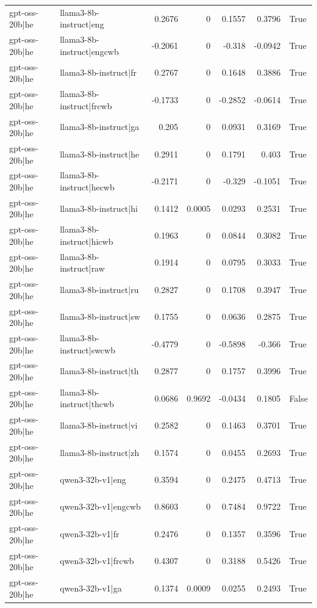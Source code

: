 \begin{table}
\begin{tabular}{l l r r r r l}
gpt-oss-20b|he & llama3-8b-instruct|eng & 0.2676 & 0 & 0.1557 & 0.3796 & True \\
gpt-oss-20b|he & llama3-8b-instruct|engcwb & -0.2061 & 0 & -0.318 & -0.0942 & True \\
gpt-oss-20b|he & llama3-8b-instruct|fr & 0.2767 & 0 & 0.1648 & 0.3886 & True \\
gpt-oss-20b|he & llama3-8b-instruct|frcwb & -0.1733 & 0 & -0.2852 & -0.0614 & True \\
gpt-oss-20b|he & llama3-8b-instruct|ga & 0.205 & 0 & 0.0931 & 0.3169 & True \\
gpt-oss-20b|he & llama3-8b-instruct|he & 0.2911 & 0 & 0.1791 & 0.403 & True \\
gpt-oss-20b|he & llama3-8b-instruct|hecwb & -0.2171 & 0 & -0.329 & -0.1051 & True \\
gpt-oss-20b|he & llama3-8b-instruct|hi & 0.1412 & 0.0005 & 0.0293 & 0.2531 & True \\
gpt-oss-20b|he & llama3-8b-instruct|hicwb & 0.1963 & 0 & 0.0844 & 0.3082 & True \\
gpt-oss-20b|he & llama3-8b-instruct|raw & 0.1914 & 0 & 0.0795 & 0.3033 & True \\
gpt-oss-20b|he & llama3-8b-instruct|ru & 0.2827 & 0 & 0.1708 & 0.3947 & True \\
gpt-oss-20b|he & llama3-8b-instruct|sw & 0.1755 & 0 & 0.0636 & 0.2875 & True \\
gpt-oss-20b|he & llama3-8b-instruct|swcwb & -0.4779 & 0 & -0.5898 & -0.366 & True \\
gpt-oss-20b|he & llama3-8b-instruct|th & 0.2877 & 0 & 0.1757 & 0.3996 & True \\
gpt-oss-20b|he & llama3-8b-instruct|thcwb & 0.0686 & 0.9692 & -0.0434 & 0.1805 & False \\
gpt-oss-20b|he & llama3-8b-instruct|vi & 0.2582 & 0 & 0.1463 & 0.3701 & True \\
gpt-oss-20b|he & llama3-8b-instruct|zh & 0.1574 & 0 & 0.0455 & 0.2693 & True \\
gpt-oss-20b|he & qwen3-32b-v1|eng & 0.3594 & 0 & 0.2475 & 0.4713 & True \\
gpt-oss-20b|he & qwen3-32b-v1|engcwb & 0.8603 & 0 & 0.7484 & 0.9722 & True \\
gpt-oss-20b|he & qwen3-32b-v1|fr & 0.2476 & 0 & 0.1357 & 0.3596 & True \\
gpt-oss-20b|he & qwen3-32b-v1|frcwb & 0.4307 & 0 & 0.3188 & 0.5426 & True \\
gpt-oss-20b|he & qwen3-32b-v1|ga & 0.1374 & 0.0009 & 0.0255 & 0.2493 & True \\

\end{tabular}
\end{table}
